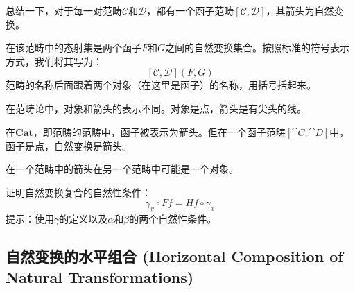 \documentclass[DaoFP]{subfiles}
\begin{document}
    总结一下，对于每一对范畴$\mathcal{C}$和$\mathcal{D}$，都有一个函子范畴$[\mathcal{C}, \mathcal{D}]$，其箭头为自然变换。

    在该范畴中的态射集是两个函子$F$和$G$之间的自然变换集合。按照标准的符号表示方式，我们将其写为：
    \[ [\mathcal{C}, \mathcal{D}](F, G) \]
    范畴的名称后面跟着两个对象（在这里是函子）的名称，用括号括起来。

    在范畴论中，对象和箭头的表示不同。对象是点，箭头是有尖头的线。

    在$\mathbf{Cat}$，即范畴的范畴中，函子被表示为箭头。但在一个函子范畴$[\cat C, \cat D]$中，函子是点，自然变换是箭头。

    在一个范畴中的箭头在另一个范畴中可能是一个对象。

    \begin{exercise}
        证明自然变换复合的自然性条件：
        \[ \gamma_y \circ F f = H f \circ \gamma_x \]
        提示：使用$\gamma$的定义以及$\alpha$和$\beta$的两个自然性条件。
    \end{exercise}

    \subsection{自然变换的水平组合 (Horizontal Composition of Natural Transformations)}
\end{document}
